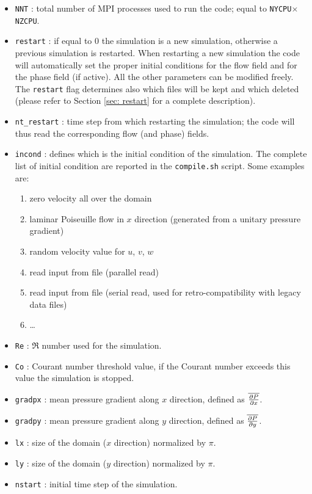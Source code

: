 \begin{itemize}
\item \texttt{NNT} : total number of MPI processes used to run the code; equal to \texttt{NYCPU}$\times$\texttt{NZCPU}.
\item \texttt{restart} : if equal to 0 the simulation is a new simulation, otherwise a previous simulation is restarted. When restarting a new simulation the code will automatically set the proper initial conditions for the flow field and for the phase field (if active). All the other parameters can be modified freely. The \texttt{restart} flag determines also which files will be kept and which deleted (please refer to Section \ref{sec: restart} for a complete description).
\item \texttt{nt\_restart} : time step from which restarting the simulation; the code will thus read the corresponding flow (and phase) fields.
\item \texttt{incond} : defines which is the initial condition of the simulation. The complete list of initial condition are reported in the \texttt{compile.sh} script. Some examples are:
\begin{enumerate}
\item zero velocity all over the domain
\item laminar Poiseuille flow in $x$ direction (generated from a unitary pressure gradient)
\item random velocity value for $u$, $v$, $w$
\item read input from file (parallel read)
\item read input from file (serial read, used for retro-compatibility with legacy data files)
\item \dots
\end{enumerate}
\item \texttt{Re} : $\Re$ number used for the simulation.
\item \texttt{Co} : Courant number threshold value, if the Courant number exceeds this value the simulation is stopped.
\item \texttt{gradpx} : mean pressure gradient along $x$ direction, defined as $\overline{\frac{\partial P}{\partial x}}$.
\item \texttt{gradpy} : mean pressure gradient along $y$ direction, defined as $\overline{\frac{\partial P}{\partial y}}$.
\item \texttt{lx} : size of the domain ($x$ direction) normalized by $\pi$.
\item \texttt{ly} : size of the domain ($y$ direction) normalized by $\pi$.
\item \texttt{nstart} : initial time step of the simulation.

\end{itemize}
